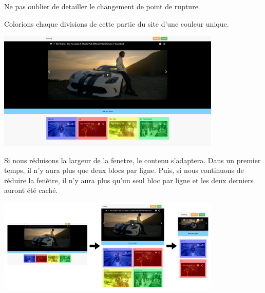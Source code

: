 \documentclass{article}
\begin{document}
Ne pas oublier de detailler le changement de point de rupture.

Colorions chaque divisions de cette partie du site d'une couleur unique.
\begin{center}
\vspace{0.5cm}
\includegraphics[width=0.8\textwidth]{pc4}
\vspace{0.5cm}
\end{center}
Si nous r\'eduisons la largeur de la fenetre, le contenu s'adaptera. Dans un premier temps, il n'y aura plus que deux blocs par ligne. Puis, si nous continuons de r\'eduire la fen\`etre, il n'y aura plus qu'un seul bloc par ligne et les deux derniers auront \'et\'e cach\'e.
\begin{center}
\vspace{0.5cm}
\includegraphics[width=0.8\textwidth]{pc7}
\vspace{0.5cm}\\
\end{center}
\end{document}
